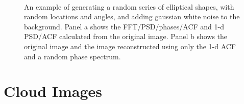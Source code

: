 \documentclass[11pt,preprint]{aastex}
\begin{document}
\begin{figure}[htbp]
\centering
{} \\
\caption{{\small
An example of generating a random series of elliptical shapes, with random locations and angles, and adding gaussian white noise to the background. Panel a shows the FFT/PSD/phases/ACF and 1-d PSD/ACF calculated from the original image. Panel b shows the original image and the image reconstructed using only the 1-d ACF and a random phase spectrum. }}
\label{fig:elliptical}
\end{figure}


\section{Cloud Images}
\end{document}
